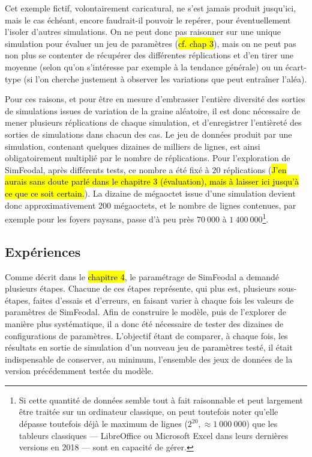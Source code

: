 	Cet exemple fictif, volontairement caricatural, ne s'est jamais produit jusqu'ici, mais le cas échéant, encore faudrait-il pouvoir le repérer, pour éventuellement l'isoler d'autres simulations.
	On ne peut donc pas raisonner sur une unique simulation pour évaluer un jeu de paramètres (\hl{cf. chap 3}), mais on ne peut pas non plus se contenter de récupérer des différentes réplications et d'en tirer une moyenne (selon qu'on s'intéresse par exemple à la tendance générale) ou un écart-type (si l'on cherche justement à observer les variations que peut entraîner l'aléa).

	Pour ces raisons, et pour être en mesure d'embrasser l'entière diversité des sorties de simulations issues de variation de la graine aléatoire, il est donc nécessaire de mener plusieurs réplications de chaque simulation, et d'enregistrer l'entièreté des sorties de simulations dans chacun des cas.
	Le jeu de données produit par une simulation, contenant quelques dizaines de milliers de lignes, est ainsi obligatoirement multiplié par le nombre de réplications.
	Pour l'exploration de SimFeodal, après différents tests, ce nombre a été fixé à $20$ réplications (\hl{J'en aurais sans doute parlé dans le chapitre 3 (évaluation), mais à laisser ici jusqu'à ce que ce soit certain.}).
	La dizaine de mégaoctet issue d'une simulation devient donc approximativement 200 mégaoctets, et le nombre de lignes contenues, par exemple pour les foyers paysans, passe d'à peu près $70~000$ à $1~400~000$\footnote{
	Si cette quantité de données semble tout à fait raisonnable et peut largement être traitée sur un ordinateur classique, on peut toutefois noter qu'elle dépasse toutefois déjà le maximum de lignes ($2^{20}, \approx 1~000~000$) que les tableurs classiques ---
	LibreOffice ou Microsoft Excel dans leurs dernières versions en 2018
	--- sont en capacité de gérer.
	}.

	\subsection{Expériences}

	Comme décrit dans le \hl{chapitre 4}, le paramétrage de SimFeodal a demandé plusieurs étapes.
	Chacune de ces étapes représente, qui plus est, plusieurs sous-étapes, faites d'essais et d'erreurs, en faisant varier à chaque fois les valeurs de paramètres de SimFeodal.
	Afin de construire le modèle, puis de l'explorer de manière plus systématique, il a donc été nécessaire de tester des dizaines de configurations de paramètres.
	L'objectif étant de comparer, à chaque fois, les résultats en sortie de simulation d'un nouveau jeu de paramètres testé, il était indispensable de conserver, au minimum, l'ensemble des jeux de données de la version précédemment testée du modèle.
	
